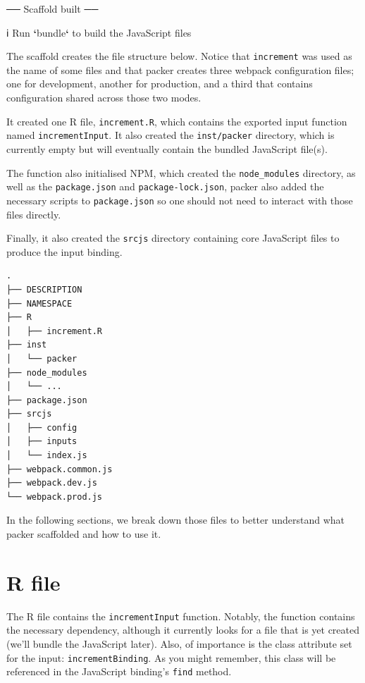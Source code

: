 \documentclass[10pt,]{krantz}
\makeatletter
\newenvironment{Shaded}{\begin{snugshade}}{\end{snugshade}}
\newcommand{\ExtensionTok}[1]{#1}
\newcommand{\KeywordTok}[1]{\textcolor[rgb]{0.27,0.27,0.27}{\textbf{#1}}}
\newcommand{\NormalTok}[1]{#1}
\newenvironment{kframe}{%
\medskip{}
\setlength{\fboxsep}{.8em}
 \def\at@end@of@kframe{}%
 \ifinner\ifhmode%
  \def\at@end@of@kframe{\end{minipage}}%
  \begin{minipage}{\columnwidth}%
 \fi\fi%
 \def\FrameCommand##1{\hskip\@totalleftmargin \hskip-\fboxsep
 \colorbox{shadecolor}{##1}\hskip-\fboxsep
     \hskip-\linewidth \hskip-\@totalleftmargin \hskip\columnwidth}%
 \MakeFramed {\advance\hsize-\width
   \@totalleftmargin\z@ \linewidth\hsize
   \@setminipage}}%
 {\par\unskip\endMakeFramed%
 \at@end@of@kframe}
\renewenvironment{Shaded}{\begin{kframe}}{\end{kframe}}
\makeatother
\begin{document}
\begin{Shaded}
\begin{Highlighting}[]
\NormalTok{── }\ExtensionTok{Scaffold}\NormalTok{ built ──}

\NormalTok{ℹ }\ExtensionTok{Run} \KeywordTok{`}\ExtensionTok{bundle}\KeywordTok{`}\NormalTok{ to build the JavaScript files}
\end{Highlighting}
\end{Shaded}

The scaffold creates the file structure below. Notice that \texttt{increment} was used as the name of some files and that packer creates three webpack configuration files; one for development, another for production, and a third that contains configuration shared across those two modes.

It created one R file, \texttt{increment.R}, which contains the exported input function named \texttt{incrementInput}. It also created the \texttt{inst/packer} directory, which is currently empty but will eventually contain the bundled JavaScript file(s).

The function also initialised NPM, which created the \texttt{node\_modules} directory, as well as the \texttt{package.json} and \texttt{package-lock.json}, packer also added the necessary scripts to \texttt{package.json} so one should not need to interact with those files directly.

Finally, it also created the \texttt{srcjs} directory containing core JavaScript files to produce the input binding.

\begin{verbatim}
.
├── DESCRIPTION
├── NAMESPACE
├── R
│   ├── increment.R
├── inst
│   └── packer
├── node_modules
│   └── ...
├── package.json
├── srcjs
│   ├── config
│   ├── inputs
│   └── index.js
├── webpack.common.js
├── webpack.dev.js
└── webpack.prod.js
\end{verbatim}

In the following sections, we break down those files to better understand what packer scaffolded and how to use it.

\hypertarget{packer-r-file}{%
\section{R file}\label{packer-r-file}}

The R file contains the \texttt{incrementInput} function. Notably, the function contains the necessary dependency, although it currently looks for a file that is yet created (we'll bundle the JavaScript later). Also, of importance is the class attribute set for the input: \texttt{incrementBinding}. As you might remember, this class will be referenced in the JavaScript binding's \texttt{find} method.
\end{document}
